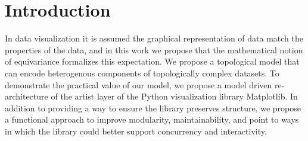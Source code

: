 \documentclass[../main.tex]{subfiles}
\begin{document}
\section{Introduction}
\label{sec:intro}
In data visualization it is assumed the graphical representation of data match the properties of the data, and in this work we propose that the mathematical notion of equivariance formalizes this expectation. We propose a topological model that can encode heterogenous components of topologically complex datasets. To demonstrate the practical value of our model, we propose a model driven re-architecture of the artist layer of the Python visualization library Matplotlib. In addition to providing a way to ensure the library preserves structure, we propose a functional approach to  improve modularity, maintainability, and point to ways in which the library could better support concurrency and interactivity.
\end{document}
